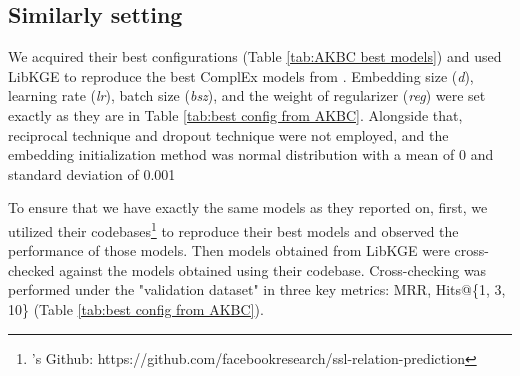 \subsection{Similarly setting}
\label{sec:Similarly setting}
We acquired their best configurations (Table \ref{tab:AKBC best models}) and used LibKGE to reproduce the best ComplEx models from \citet{chen2021relation}. Embedding size (\textit{d}), learning rate (\textit{lr}), batch size (\textit{bsz}), and the weight of regularizer (\textit{reg}) were set exactly as they are in Table \ref{tab:best config from AKBC}. Alongside that, reciprocal technique and dropout technique were not employed, and the embedding initialization method was normal distribution with a mean of 0 and standard deviation of 0.001 


To ensure that we have exactly the same models as they reported on, first, we utilized their codebases\footnote{\citet{chen2021relation}'s Github: https://github.com/facebookresearch/ssl-relation-prediction} to reproduce their best models and observed the performance of those models. Then models obtained from LibKGE were cross-checked against the models obtained using their codebase. Cross-checking was performed under the "validation dataset" in three key metrics: MRR, Hits@\{1, 3, 10\} (Table \ref{tab:best config from AKBC}).

